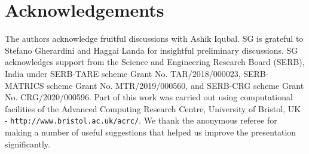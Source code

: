\documentclass[12pt]{iopart}
\begin{document}
\section{Acknowledgements}
The authors acknowledge fruitful discussions with Ashik Iqubal. SG is
grateful to Stefano Gherardini and Haggai Landa for insightful preliminary discussions. SG acknowledges support from the Science and Engineering Research
Board (SERB), India under SERB-TARE scheme Grant No.
TAR/2018/000023, SERB-MATRICS scheme Grant No.
MTR/2019/000560, and SERB-CRG scheme Grant No. CRG/2020/000596. Part of this work was carried out using computational facilities of the Advanced Computing Research Centre,
University of Bristol, UK - \texttt{http://www.bristol.ac.uk/acrc/}.  We thank the anonymous referee for making a number of useful suggestions that helped us improve the presentation significantly.
\end{document}
